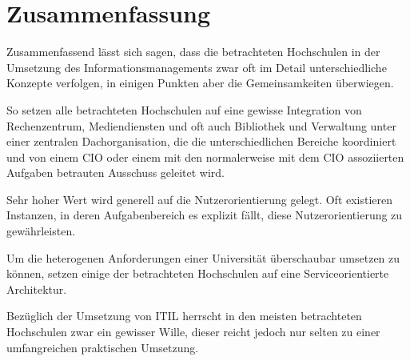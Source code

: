 \section{Zusammenfassung}
Zusammenfassend lässt sich sagen, dass die betrachteten Hochschulen in der Umsetzung des Informationsmanagements zwar oft im Detail unterschiedliche Konzepte verfolgen, in einigen Punkten aber die Gemeinsamkeiten überwiegen.

So setzen alle betrachteten Hochschulen auf eine gewisse Integration von Rechenzentrum, Mediendiensten und oft auch Bibliothek und Verwaltung unter einer zentralen Dachorganisation, die die unterschiedlichen Bereiche koordiniert und von einem CIO oder einem mit den normalerweise mit dem CIO assoziierten Aufgaben betrauten Ausschuss geleitet wird.

Sehr hoher Wert wird generell auf die Nutzerorientierung gelegt. Oft existieren Instanzen, in deren Aufgabenbereich es explizit fällt, diese Nutzerorientierung zu gewährleisten.

Um die heterogenen Anforderungen einer Universität überschaubar umsetzen zu können, setzen einige der betrachteten Hochschulen auf eine Serviceorientierte Architektur.

Bezüglich der Umsetzung von ITIL herrscht in den meisten betrachteten Hochschulen zwar ein gewisser Wille, dieser reicht jedoch nur selten zu einer umfangreichen praktischen Umsetzung.